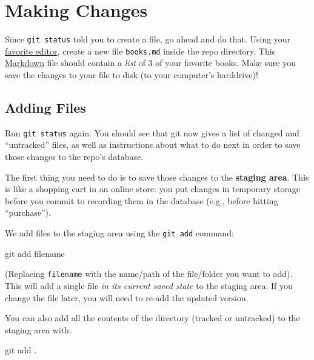 \documentclass[]{book}
\newenvironment{Shaded}{\begin{snugshade}}{\end{snugshade}}
\newcommand{\FunctionTok}[1]{\textcolor[rgb]{0.00,0.00,0.00}{#1}}
\newcommand{\NormalTok}[1]{#1}
\theoremstyle{definition}
\theoremstyle{definition}
\theoremstyle{remark}
\begin{document}
\section{Making Changes}\label{making-changes}

Since \texttt{git\ status} told you to create a file, go ahead and do
that. Using your \href{https://atom.io/}{favorite editor}, create a new
file \texttt{books.md} inside the repo directory. This
\protect\hyperlink{markdown}{Markdown} file should contain a \emph{list}
of 3 of your favorite books. Make sure you save the changes to your file
to disk (to your computer's harddrive)!

\subsection{Adding Files}\label{adding-files}

Run \texttt{git\ status} again. You should see that git now gives a list
of changed and ``untracked'' files, as well as instructions about what
to do next in order to save those changes to the repo's database.

The first thing you need to do is to save those changes to the
\textbf{staging area}. This is like a shopping cart in an online store:
you put changes in temporary storage before you commit to recording them
in the database (e.g., before hitting ``purchase'').

We add files to the staging area using the \texttt{git\ add} command:

\begin{Shaded}
\begin{Highlighting}[]
\FunctionTok{git}\NormalTok{ add filename}
\end{Highlighting}
\end{Shaded}

(Replacing \texttt{filename} with the name/path of the file/folder you
want to add). This will add a single file \emph{in its current saved
state} to the staging area. If you change the file later, you will need
to re-add the updated version.

You can also add all the contents of the directory (tracked or
untracked) to the staging area with:

\begin{Shaded}
\begin{Highlighting}[]
\FunctionTok{git}\NormalTok{ add .}
\end{Highlighting}
\end{Shaded}
\end{document}
